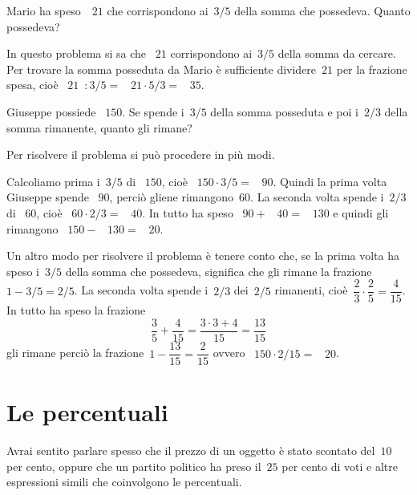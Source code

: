 \begin{exrig}
 \begin{esempio}
Mario ha speso~\officialeuro~$21$ che corrispondono ai~$3/5$ della somma che possedeva. Quanto possedeva?

In questo problema si sa che \officialeuro~$21$ corrispondono ai~$3/5$ della somma da cercare.
Per trovare la somma posseduta da Mario è sufficiente dividere~$21$ per la frazione spesa, cioè
\officialeuro~$21$~$\displaystyle: 3/5=$ \officialeuro~$21\cdot 5/3=$ \officialeuro~$35$.
 \end{esempio}

 \begin{esempio}
Giuseppe possiede \officialeuro~$150$. Se spende i~$3/5$ della somma posseduta e poi i~$2/3$ della somma rimanente,
quanto gli rimane?

Per risolvere il problema si può procedere in più modi.

Calcoliamo prima i~$3/5$ di \officialeuro~$150$, cioè \officialeuro~$150\cdot 3/5=$ \officialeuro~$90$.
Quindi la prima volta Giuseppe spende \officialeuro~$90$, perciò gliene rimangono~$60$. La seconda volta spende
i~$2/3$ di \officialeuro~$60$, cioè \officialeuro~$60\cdot 2/3=$ \officialeuro~$40$. In tutto ha speso
\officialeuro~$90+$ \officialeuro~$40=$ \officialeuro~$130$ e quindi gli rimangono \officialeuro~$150-$ \officialeuro~$130=$ \officialeuro~$20$.

Un altro modo per risolvere il problema è tenere conto che,
se la prima volta ha speso i~$3/5$ della somma che possedeva,
significa che gli rimane la frazione~$1-3/5=2/5$.
La seconda volta spende i~$2/3$ dei~$2/5$ rimanenti, cioè~$\dfrac{2}{3}\cdot\dfrac{2}{5}=\dfrac{4}{15}$.
In tutto ha speso la frazione
\[\frac{3}{5}+\frac{4}{15}=\frac{3\cdot3+4}{15}=\frac{13}{15}\]
gli rimane perciò la frazione~$1-\dfrac{13}{15}=\dfrac{2}{15}$ ovvero \officialeuro~$150\cdot 2/15=$ \officialeuro~$20$.
 \end{esempio}
\end{exrig}

\ovalbox{\risolvii \ref{ese:3.77}, \ref{ese:3.78}, \ref{ese:3.79}, \ref{ese:3.80}}

\section{Le percentuali}

Avrai sentito parlare spesso che il prezzo di un oggetto è stato scontato del~$10$ per cento,
oppure che un partito politico ha preso il~$25$ per cento di voti
e altre espressioni simili che coinvolgono le percentuali.

